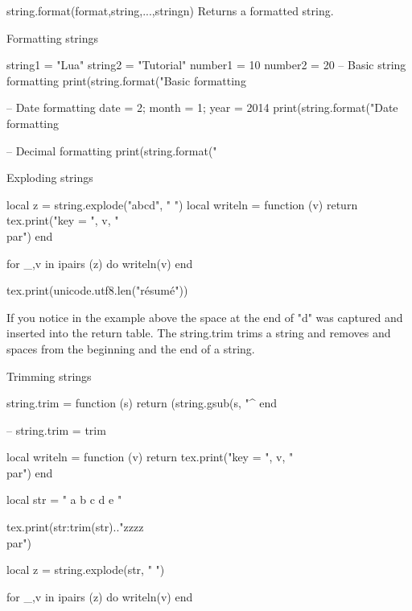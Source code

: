 \begin{docLua}{string.format(format,string,...,stringn)}
Returns a formatted string.
\end{docLua}


\begin{texexample}{Formatting strings}{}
\begin{luacode}
string1 = "Lua"
string2 = "Tutorial"
number1 = 10
number2 = 20
-- Basic string formatting
print(string.format("Basic formatting %

-- Date formatting
date = 2; month = 1; year = 2014
print(string.format("Date formatting %

-- Decimal formatting
print(string.format("%
\end{luacode}
\end{texexample}




\begin{texexample}{Exploding strings}{}
\begin{luacode}
local z = string.explode("abcd", " ")
local   writeln = function (v) 
   return   tex.print("key = ", v, "\\par")
end

for _,v in ipairs (z) do
  writeln(v)
end

tex.print(unicode.utf8.len("résumé"))
\end{luacode}
\end{texexample}

If you notice in the example above the space at the end of "d" was captured and inserted into the return table. The string.trim trims a string and removes and spaces from the beginning and the end of a string.

\begin{texexample}{Trimming strings}{}
\begin{luacode*}


string.trim = function (s)
   return (string.gsub(s, "^%
end

-- string.trim = trim

local  writeln = function (v) 
   return   tex.print("key = ", v, "\\par")
end

local str = " a b c d e "

tex.print(str:trim(str).."zzzz\\par")

local z = string.explode(str, " ")
  
for _,v in ipairs (z) do
  writeln(v)
end
\end{luacode*}
\end{texexample}

